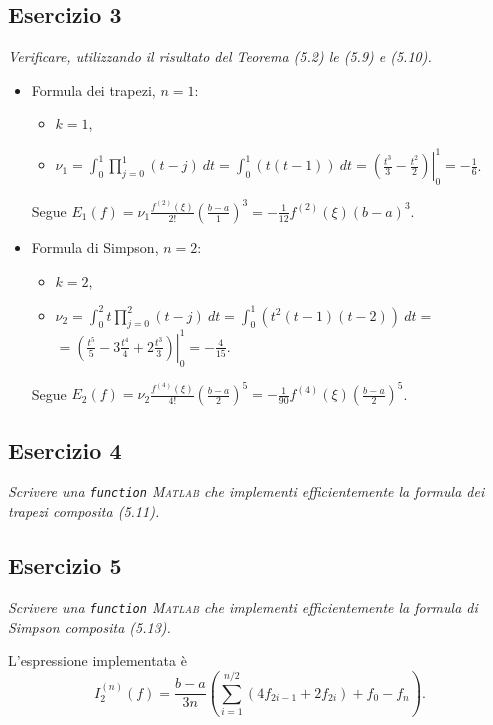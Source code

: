 \subsection{Esercizio 3}
\label{sub:es3}
\emph{Verificare, utilizzando il risultato del Teorema (5.2) le (5.9) e (5.10).}
\begin{sol}
	\begin{itemize}
		\item Formula dei trapezi, $n=1$:
			\begin{itemize}
				\item $k=1$,
				\item $\nu_1=\int_0^1{\prod_{j=0}^1{(t-j)}\:dt}=\int_0^1{(t(t-1))\:dt}=\left.\left(\frac{t^3}{3}-\frac{t^2}{2}\right)\right|_0^1=-\frac{1}{6}$.
			\end{itemize}
			Segue $E_1(f)=\nu_1\frac{f^{(2)}(\xi)}{2!}\left(\frac{b-a}{1}\right)^3=-\frac{1}{12}f^{(2)}(\xi)(b-a)^3$.
		\item Formula di Simpson, $n=2$:
			\begin{itemize}
				\item $k=2$,
				\item $\nu_2=\int_0^2{t\prod_{j=0}^2{(t-j)}\:dt}=\int_0^1{(t^2(t-1)(t-2))\:dt}=$\\$=\left.\left(\frac{t^5}{5}-3\frac{t^4}{4}+2\frac{t^3}{3}\right)\right|_0^1=-\frac{4}{15}$.
			\end{itemize}
			Segue $E_2(f)=\nu_2\frac{f^{(4)}(\xi)}{4!}\left(\frac{b-a}{2}\right)^5=-\frac{1}{90}f^{(4)}(\xi)\left(\frac{b-a}{2}\right)^5$.
	\end{itemize}
\end{sol}

\subsection{Esercizio 4}
\label{sub:es4}
\emph{Scrivere una \lstinline{function} \textsc{Matlab} che implementi efficientemente la formula dei trapezi composita (5.11).}
\begin{sol}
	
\end{sol}

\subsection{Esercizio 5}
\label{sub:es5}
\emph{Scrivere una \lstinline{function} \textsc{Matlab} che implementi efficientemente la formula di Simpson composita (5.13).}
\begin{sol}
	
	L'espressione implementata è
	$$I_2^{(n)}(f)=\frac{b-a}{3n}(\sum_{i=1}^{n/2}(4f_{2i-1}+2f_{2i})+f_0-f_n).$$
\end{sol}

